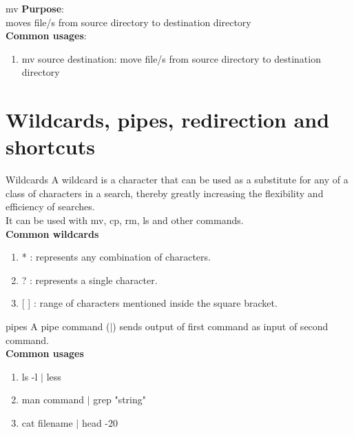 \documentclass[11pt]{beamer}
\begin{document}
\begin{frame}{mv}
\textbf{Purpose}:\\
\large moves file/s from source directory to destination directory\vspace{1cm}\pause \\
 
\textbf{Common usages}:\\
\begin{enumerate}
\item mv source destination: move file/s from source directory to destination directory
\end{enumerate}
\end{frame}

\section{Wildcards, pipes, redirection and shortcuts}
\begin{frame}{Wildcards}
A wildcard is a character that can be used as a substitute for any of a class of characters in a search, thereby greatly increasing the flexibility and efficiency of searches.\\
It can be used with  mv, cp, rm, ls and other commands.\\ \vspace{1cm}
\textbf{\large Common wildcards}
\begin{enumerate}
\item * : represents any combination of characters.\pause
\item ? : represents a single character.\pause
\item {[ ]} : range of characters mentioned inside the square bracket.
\end{enumerate}
\end{frame}

\begin{frame}{pipes}
A pipe command ($|$) sends output of first command as input of second command.\\ \vspace{1cm}
\textbf{\large Common usages}
\begin{enumerate}
\item ls -l $|$ less
\item man command $|$ grep "string"
\item cat filename $|$ head -20
\end{enumerate}
\end{frame}
\end{document}
